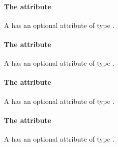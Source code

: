 \paragraph{The \fixttspace{} attribute}

A \RenderInformationBase has an optional attribute 
of type .

\paragraph{The \fixttspace{} attribute}

A \RenderInformationBase has an optional attribute
 of type .

\paragraph{The \fixttspace{} attribute}

A \RenderInformationBase has an optional attribute
 of type .

\paragraph{The \fixttspace{} attribute}

A \RenderInformationBase has an optional attribute
 of type .

